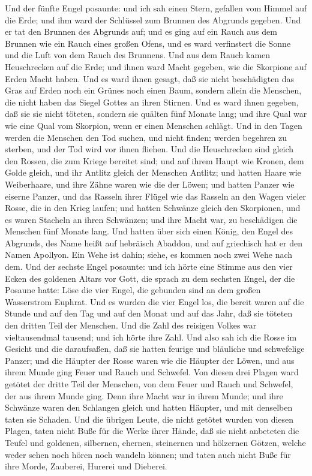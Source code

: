  Und der fünfte Engel posaunte: und ich sah einen Stern,
gefallen vom Himmel auf die Erde; und ihm ward der Schlüssel zum Brunnen
des Abgrunds gegeben.  Und er tat den Brunnen des Abgrunds
auf; und es ging auf ein Rauch aus dem Brunnen wie ein Rauch eines
großen Ofens, und es ward verfinstert die Sonne und die Luft von dem
Rauch des Brunnens.  Und aus dem Rauch kamen Heuschrecken
auf die Erde; und ihnen ward Macht gegeben, wie die Skorpione auf Erden
Macht haben.  Und es ward ihnen gesagt, daß sie nicht
beschädigten das Gras auf Erden noch ein Grünes noch einen Baum, sondern
allein die Menschen, die nicht haben das Siegel Gottes an ihren Stirnen.
 Und es ward ihnen gegeben, daß sie sie nicht töteten,
sondern sie quälten fünf Monate lang; und ihre Qual war wie eine Qual
vom Skorpion, wenn er einen Menschen schlägt.  Und in den
Tagen werden die Menschen den Tod suchen, und nicht finden; werden
begehren zu sterben, und der Tod wird vor ihnen fliehen. 
Und die Heuschrecken sind gleich den Rossen, die zum Kriege bereitet
sind; und auf ihrem Haupt wie Kronen, dem Golde gleich, und ihr Antlitz
gleich der Menschen Antlitz;  und hatten Haare wie
Weiberhaare, und ihre Zähne waren wie die der Löwen;  und
hatten Panzer wie eiserne Panzer, und das Rasseln ihrer Flügel wie das
Rasseln an den Wagen vieler Rosse, die in den Krieg laufen;
 und hatten Schwänze gleich den Skorpionen, und es waren
Stacheln an ihren Schwänzen; und ihre Macht war, zu beschädigen die
Menschen fünf Monate lang.  Und hatten über sich einen
König, den Engel des Abgrunds, des Name heißt auf hebräisch Abaddon, und
auf griechisch hat er den Namen Apollyon.  Ein Wehe ist
dahin; siehe, es kommen noch zwei Wehe nach dem.  Und der
sechste Engel posaunte: und ich hörte eine Stimme aus den vier Ecken des
goldenen Altars vor Gott,  die sprach zu dem sechsten
Engel, der die Posaune hatte: Löse die vier Engel, die gebunden sind an
dem großen Wasserstrom Euphrat.  Und es wurden die vier
Engel los, die bereit waren auf die Stunde und auf den Tag und auf den
Monat und auf das Jahr, daß sie töteten den dritten Teil der Menschen.
 Und die Zahl des reisigen Volkes war vieltausendmal
tausend; und ich hörte ihre Zahl.  Und also sah ich die
Rosse im Gesicht und die daraufsaßen, daß sie hatten feurige und
bläuliche und schwefelige Panzer; und die Häupter der Rosse waren wie
die Häupter der Löwen, und aus ihrem Munde ging Feuer und Rauch und
Schwefel.  Von diesen drei Plagen ward getötet der dritte
Teil der Menschen, von dem Feuer und Rauch und Schwefel, der aus ihrem
Munde ging.  Denn ihre Macht war in ihrem Munde; und ihre
Schwänze waren den Schlangen gleich und hatten Häupter, und mit
denselben taten sie Schaden.  Und die übrigen Leute, die
nicht getötet wurden von diesen Plagen, taten nicht Buße für die Werke
ihrer Hände, daß sie nicht anbeteten die Teufel und goldenen, silbernen,
ehernen, steinernen und hölzernen Götzen, welche weder sehen noch hören
noch wandeln können;  und taten auch nicht Buße für ihre
Morde, Zauberei, Hurerei und Dieberei.

